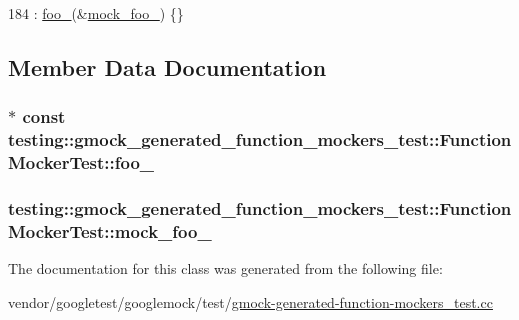 \begin{DoxyCode}
184 : \hyperlink{classtesting_1_1gmock__generated__function__mockers__test_1_1FunctionMockerTest_ae2b8b577c4808f2dff9797168468f65f}{foo\_}(&\hyperlink{classtesting_1_1gmock__generated__function__mockers__test_1_1FunctionMockerTest_a265659f07a0e75152ab295add4769585}{mock\_foo\_}) \{\}
\end{DoxyCode}


\subsection{Member Data Documentation}
\subsubsection[{\texorpdfstring{foo\+\_\+}{foo_}}]{$\ast$ const testing\+::gmock\+\_\+generated\+\_\+function\+\_\+mockers\+\_\+test\+::\+Function\+Mocker\+Test\+::foo\+\_\+\hspace{0.3cm}{\ttfamily [protected]}}\hypertarget{classtesting_1_1gmock__generated__function__mockers__test_1_1FunctionMockerTest_ae2b8b577c4808f2dff9797168468f65f}{}\label{classtesting_1_1gmock__generated__function__mockers__test_1_1FunctionMockerTest_ae2b8b577c4808f2dff9797168468f65f}
\subsubsection[{\texorpdfstring{mock\+\_\+foo\+\_\+}{mock_foo_}}]{ testing\+::gmock\+\_\+generated\+\_\+function\+\_\+mockers\+\_\+test\+::\+Function\+Mocker\+Test\+::mock\+\_\+foo\+\_\+\hspace{0.3cm}{\ttfamily [protected]}}\hypertarget{classtesting_1_1gmock__generated__function__mockers__test_1_1FunctionMockerTest_a265659f07a0e75152ab295add4769585}{}\label{classtesting_1_1gmock__generated__function__mockers__test_1_1FunctionMockerTest_a265659f07a0e75152ab295add4769585}


The documentation for this class was generated from the following file\+:\begin{DoxyCompactItemize}
\item 
vendor/googletest/googlemock/test/\hyperlink{gmock-generated-function-mockers__test_8cc}{gmock-\/generated-\/function-\/mockers\+\_\+test.\+cc}\end{DoxyCompactItemize}
